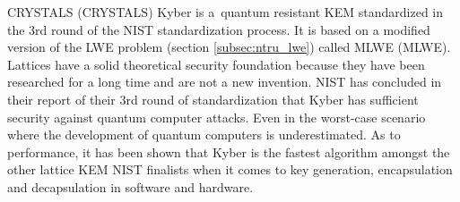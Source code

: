 CRYSTALS (\acl{CRYSTALS}) Kyber is a~quantum resistant KEM  standardized in the 3rd round of the NIST standardization process. It is based on a modified version of the LWE problem (section \ref{subsec:ntru_lwe}) called MLWE (\acl{MLWE}). Lattices have a solid theoretical security foundation because they have been researched for a long time and are not a new invention. NIST has concluded in their report of their 3rd round of standardization that Kyber has sufficient security against quantum computer attacks. Even in the worst-case scenario where the development of quantum computers is underestimated. As to performance, it has been shown that Kyber is the fastest algorithm amongst the other lattice KEM NIST finalists when it comes to key generation, encapsulation and decapsulation in software and hardware. \cite{Grimes2020}\cite{Alagic2022}
